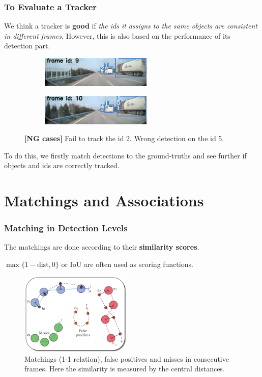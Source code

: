 \documentclass[slidetop, mathserif, dvipsnames]{beamer}
\begin{document}
\begin{frame}
	\frametitle{To Evaluate a Tracker}

	We think a tracker is {\bf good} if
	\emph{the ids it assigns to the same objects are consistent in different frames}.
	However, this is also based on the performance of its detection part.

	\begin{figure}
		\begin{subfigure}{.48\textwidth}
		\includegraphics[width=150pt]{pics/track03.jpg}
		\end{subfigure}
		\begin{subfigure}{.48\textwidth}
		\includegraphics[width=150pt]{pics/track04.jpg}
		\end{subfigure}
		\caption{{\color{red}\bf [NG cases]} Fail to track the id 2.
			Wrong detection on the id 5.}
	\end{figure}

	To do this, we firstly match detections to the ground-truths
	and see further if objects and ids are correctly tracked.

\end{frame}

\section{Matchings and Associations}

\begin{frame}
	\frametitle{Matching in Detection Levels}
			
	The matchings are done according to their {\bf similarity scores}.
	
	$\max\{1-\text{dist}, 0\}$ or IoU
	are often used as scoring functions.
			
	\begin{figure}
		\includegraphics[width=150pt]{pics/fig2.png}
		\caption{Matchings (1-1 relation), false positives and misses in consecutive frames.
		Here the similarity is measured by the central distances.}
	\end{figure}

\end{frame}
\end{document}
